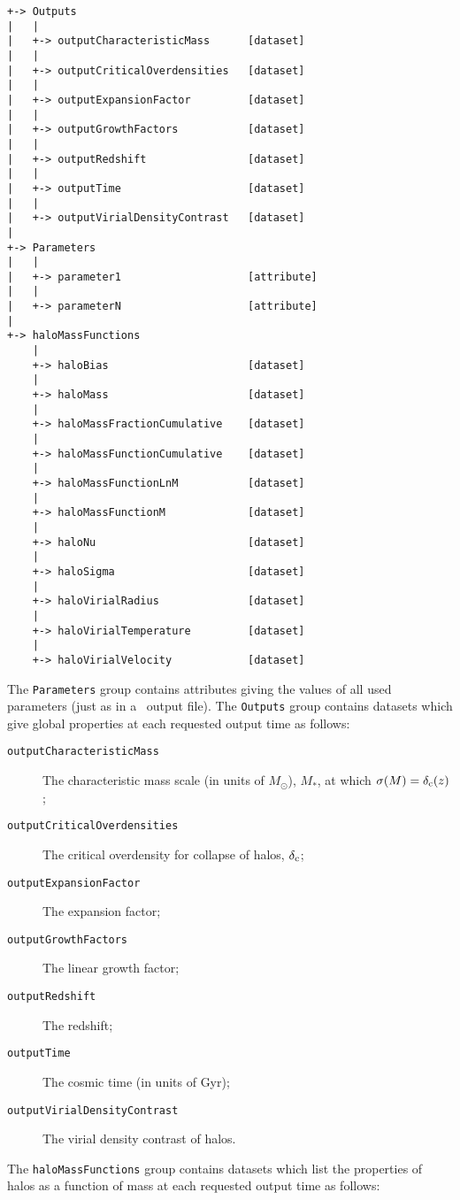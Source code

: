 \begin{verbatim}
+-> Outputs
|   |
|   +-> outputCharacteristicMass      [dataset]
|   |
|   +-> outputCriticalOverdensities   [dataset]
|   |
|   +-> outputExpansionFactor         [dataset]
|   |
|   +-> outputGrowthFactors           [dataset]
|   |
|   +-> outputRedshift                [dataset]
|   |
|   +-> outputTime                    [dataset]
|   |
|   +-> outputVirialDensityContrast   [dataset]
|    
+-> Parameters
|   |
|   +-> parameter1                    [attribute]
|   |
|   +-> parameterN                    [attribute]
|    
+-> haloMassFunctions
    |
    +-> haloBias                      [dataset]
    |
    +-> haloMass                      [dataset]
    |
    +-> haloMassFractionCumulative    [dataset]
    |
    +-> haloMassFunctionCumulative    [dataset]
    |
    +-> haloMassFunctionLnM           [dataset]
    |
    +-> haloMassFunctionM             [dataset]
    |
    +-> haloNu                        [dataset]
    |
    +-> haloSigma                     [dataset]
    |
    +-> haloVirialRadius              [dataset]
    |
    +-> haloVirialTemperature         [dataset]
    |
    +-> haloVirialVelocity            [dataset]
\end{verbatim}
The {\tt Parameters} group contains attributes giving the values of all used parameters (just as in a \glc\ output file). The {\tt Outputs} group contains datasets which give global properties at each requested output time as follows:
\begin{description}
\item [{\tt outputCharacteristicMass}] The characteristic mass scale (in units of $M_\odot$), $M_*$, at which $\sigma(M)=\delta_{\rm c}(z)$;
\item [{\tt outputCriticalOverdensities}] The critical overdensity for collapse of halos, $\delta_{\rm c}$;
\item [{\tt outputExpansionFactor}] The expansion factor;
\item [{\tt outputGrowthFactors}] The linear growth factor;
\item [{\tt outputRedshift}] The redshift;
\item [{\tt outputTime}] The cosmic time (in units of Gyr);
\item [{\tt outputVirialDensityContrast}] The virial density contrast of halos.
\end{description}
The {\tt haloMassFunctions} group contains datasets which list the properties of halos as a function of mass at each requested output time as follows:
